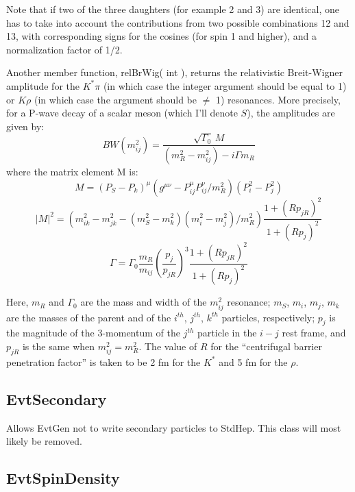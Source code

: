 Note that if two of the three daughters (for example 2 and 3) are identical, 
one has to take into account the contributions from two possible combinations 
12 and 13, with corresponding signs for the cosines (for spin 1 and higher), and a normalization factor of 1/2.   

Another member function, relBrWig( int ), returns the relativistic Breit-Wigner amplitude for the $K^{*} \pi$ (in which case the integer argument should be equal to 1) or $K \rho$ (in which case the argument should be $\neq$ 1) resonances.  More precisely, for a P-wave decay of a scalar meson (which I'll denote $S$), the amplitudes are given by:
\begin{equation}
BW(m_{ij}^2) = \frac{\sqrt{\Gamma_{0}} \,M}{(m_{R}^2 - m_{ij}^2) - i \Gamma m_{R}}
\end{equation}
where the matrix element M is:
\begin{equation}
M = (P_{S} - P_{k})^{\mu}(g^{\mu \nu} - P_{ij}^{\mu}P_{ij}^{\nu}/m_{R}^2)(P_{i}^2 - P_{j}^2)
\end{equation}
\begin{equation}
|M|^2 = (m_{ik}^2 - m_{jk}^2 - (m_{S}^2 - m_{k}^2)(m_{i}^2 - m_{j}^2)/m_{R}^2)\frac{1 + (Rp_{jR})^2}{1 + (Rp_{j})^2}
\end{equation}
\begin{equation}
\Gamma = \Gamma_{0}\frac{m_{R}}{m_{ij}}\left(\frac{p_{j}}{p_{jR}}\right)^3\frac{1 + (Rp_{jR})^2}{1 + (Rp_{j})^2}
\end{equation}

Here,  $m_{R}$ and $\Gamma_{0}$ are the mass and width of the $m_{ij}^2$ resonance; $m_{S}$, $m_{i}$, $m_{j}$, $m_{k}$ are the masses of the parent and of the $i^{th}$, $j^{th}$, $k^{th}$ particles, respectively; $p_{j}$ is the magnitude of the 3-momentum of the $j^{th}$ particle in the $i-j$ rest frame, and $p_{jR}$ is the same when $m_{ij}^2 = m_{R}^2$.  The value of $R$ for the ``centrifugal barrier penetration factor'' is taken to be 2 fm for the $K^{*}$ and 5 fm for the $\rho$.


\subsection{EvtSecondary}

Allows EvtGen not to write secondary particles to StdHep. This
class will most likely be removed.

\subsection{EvtSpinDensity}

